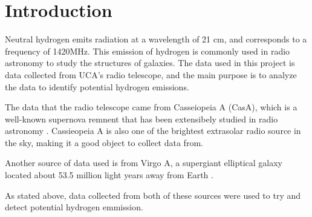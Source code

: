 \section{Introduction}

Neutral hydrogen emits radiation at a wavelength of 21 cm, and corresponds to a frequency of 1420MHz. 
This emission of hydrogen is commonly used in radio astronomy to study the structures of galaxies. 
The data used in this project is data collected from UCA's radio telescope, and the main purpose is to analyze the data to identify potential hydrogen emissions.

The data that the radio telescope came from Casseiopeia A (CasA), which is a well-known supernova remnent that has been extensibely studied in radio astronomy \cite{chandra_casa}.
Cassieopeia A is also one of the brightest extrasolar radio source in the sky, making it a good object to collect data from.

Another source of data used is from Virgo A, a supergiant elliptical galaxy located about 53.5 million light years away from Earth \cite{plotner_virgoA}.

As stated above, data collected from both of these sources were used to try and detect potential hydrogen emmission.

